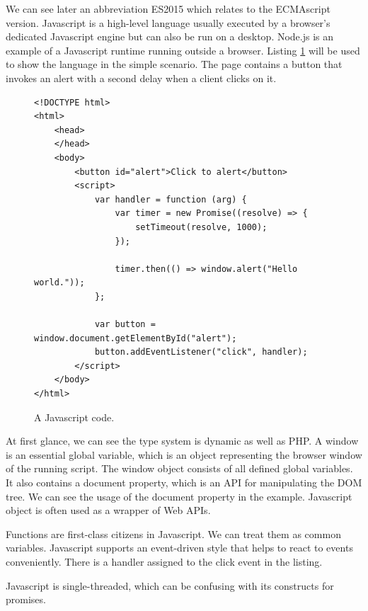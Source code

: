 We can see later an abbreviation ES2015 which relates to the ECMAscript version.
Javascript is a high-level language usually executed by a browser's dedicated Javascript engine but can also be run on a desktop.
Node.js is an example of a Javascript runtime running outside a browser.
Listing \ref{img02:javascript} will be used to show the language in the simple scenario.
The page contains a button that invokes an alert with a second delay when a client clicks on it.
\par
\begin{figure}[H]
\begin{lstlisting}
<!DOCTYPE html>
<html>
    <head>
    </head>
    <body>
        <button id="alert">Click to alert</button>
        <script>
            var handler = function (arg) {
                var timer = new Promise((resolve) => {
                    setTimeout(resolve, 1000);
                }); 
        
                timer.then(() => window.alert("Hello world."));
            };  

            var button = window.document.getElementById("alert");
            button.addEventListener("click", handler);
        </script>
    </body>
</html>
\end{lstlisting}
\caption{A Javascript code.}
\label{img02:javascript}
\end{figure}
\par
{}
At first glance, we can see the type system is dynamic as well as PHP.
A window is an essential global variable, which is an object representing the browser window of the running script.
The window object consists of all defined global variables.
It also contains a document property, which is an API for manipulating the DOM tree.
We can see the usage of the document property in the example.
Javascript object is often used as a wrapper of Web APIs.
\par
Functions are first-class citizens in Javascript.
We can treat them as common variables.
Javascript supports an event-driven style that helps to react to events conveniently.
There is a handler assigned to the click event in the listing.
\par
{}
Javascript is single-threaded, which can be confusing with its constructs for promises.
